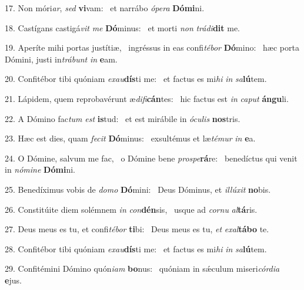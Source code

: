 17. Non móri\textit{ar}, \textit{sed} \textbf{vi}vam: \ast\  et narrábo \textit{ó}\textit{pe}\textit{ra} \textbf{Dó}\textbf{mi}ni.\

18. Castígans castigá\textit{vit} \textit{me} \textbf{Dó}minus: \ast\  et morti \textit{non} \textit{trá}\textit{di}\textbf{dit} me.\

19. Aperíte mihi portas justítiæ, \dag\  ingréssus in eas confi\textit{té}\textit{bor} \textbf{Dó}mino: \ast\  hæc porta Dómini, justi in\textit{trá}\textit{bunt} \textit{in} \textbf{e}am.\

20. Confitébor tibi quóniam \textit{ex}\textit{au}\textbf{dís}ti me: \ast\  et factus es mi\textit{hi} \textit{in} \textit{sa}\textbf{lú}tem.\

21. Lápidem, quem reprobavérunt æ\textit{di}\textit{fi}\textbf{cán}tes: \ast\  hic factus est \textit{in} \textit{ca}\textit{put} \textbf{án}\textbf{gu}li.\

22. A Dómino fac\textit{tum} \textit{est} \textbf{is}tud: \ast\  et est mirábile in \textit{ó}\textit{cu}\textit{lis} \textbf{nos}tris.\

23. Hæc est dies, quam \textit{fe}\textit{cit} \textbf{Dó}minus: \ast\  exsultémus et læ\textit{té}\textit{mur} \textit{in} \textbf{e}a.\

24. O Dómine, salvum me fac, \dag\  o Dómine bene \textit{pro}\textit{spe}\textbf{rá}re: \ast\  benedíctus qui venit in \textit{nó}\textit{mi}\textit{ne} \textbf{Dó}\textbf{mi}ni.\

25. Benedíximus vobis de \textit{do}\textit{mo} \textbf{Dó}mini: \ast\  Deus Dóminus, et \textit{il}\textit{lú}\textit{xit} \textbf{no}bis.\

26. Constitúite diem solémnem \textit{in} \textit{con}\textbf{dén}sis, \ast\  usque ad \textit{cor}\textit{nu} \textit{al}\textbf{tá}ris.\

27. Deus meus es tu, et confi\textit{té}\textit{bor} \textbf{ti}bi: \ast\  Deus meus es tu, \textit{et} \textit{ex}\textit{al}\textbf{tá}\textbf{bo} te.\

28. Confitébor tibi quóniam \textit{ex}\textit{au}\textbf{dís}ti me: \ast\  et factus es mi\textit{hi} \textit{in} \textit{sa}\textbf{lú}tem.\

29. Confitémini Dómino quón\textit{i}\textit{am} \textbf{bo}nus: \ast\  quóniam in sǽculum miseri\textit{cór}\textit{di}\textit{a} \textbf{e}jus.\

